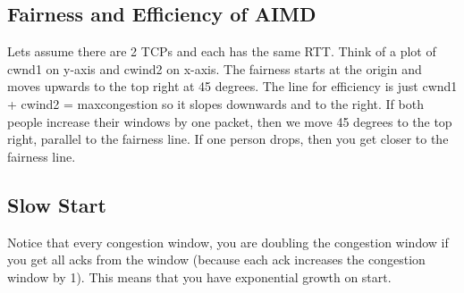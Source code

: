 \documentclass[psamsfonts]{amsart}
\begin{document}
\subsection{Fairness and Efficiency of AIMD}

Lets assume there are 2 TCPs and each has the same RTT. Think of a plot of cwnd1 on y-axis and cwind2 on x-axis. The fairness starts at the origin and moves upwards to the top right at 45 degrees. The line for efficiency is just cwnd1 + cwind2 = maxcongestion so it slopes downwards and to the right. If both people increase their windows by one packet, then we move 45 degrees to the top right, parallel to the fairness line. If one person drops, then you get closer to the fairness line.

\subsection{Slow Start}

Notice that every congestion window, you are doubling the congestion window if you get all acks from the window (because each ack increases the congestion window by 1). This means that you have exponential growth on start.
\end{document}

